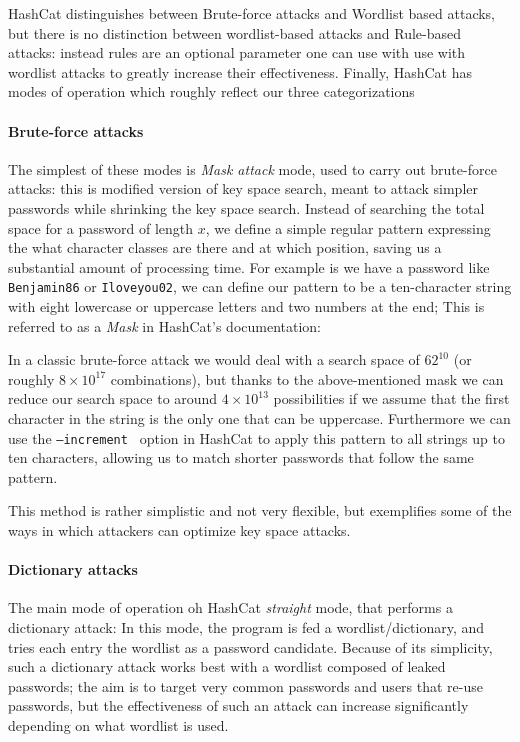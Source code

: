 HashCat distinguishes between Brute-force attacks and Wordlist based attacks, but there is no distinction between wordlist-based attacks and Rule-based attacks: instead rules are an optional parameter one can use with use with wordlist attacks to greatly increase their effectiveness.
Finally, HashCat has modes of operation which roughly reflect our three categorizations 

\paragraph{Brute-force attacks}\label{par:brute-force}
The simplest of these modes is \emph{Mask attack} mode, used to carry out brute-force attacks: this is modified version of key space search, meant to attack simpler passwords while shrinking the key space search. 
Instead of searching the total space for a password of length $x$, we define a simple regular pattern expressing the what character classes are there and at which position, saving us a substantial amount of processing time.
For example is we have a password like \texttt{Benjamin86} or \texttt{Iloveyou02}, we can define our pattern to be a ten-character string with eight lowercase or uppercase letters and two numbers at the end; This is referred to as a \emph{Mask} in HashCat's documentation:

In a classic brute-force attack we would deal with a search space of $62^{10}$ (or roughly $8 \times 10^{17}$ combinations), but thanks to the above-mentioned mask we can reduce our search space to around $4 \times 10^{13}$ possibilities if we assume that the first character in the string is the only one that can be uppercase.
Furthermore we can use the \texttt{--increment } option in HashCat to apply this pattern to all strings up to ten characters, allowing us to match shorter passwords that follow the same pattern.

This method is rather simplistic and not very flexible, but exemplifies some of the ways in which attackers can optimize key space attacks.

\paragraph{Dictionary attacks}
The main mode of operation oh HashCat \emph{straight} mode, that performs a dictionary attack: In this mode, the program is fed a wordlist/dictionary, and tries each entry the wordlist as a password candidate. Because of its simplicity, such a dictionary attack works best with a wordlist composed of leaked passwords; the aim is to target very common passwords and users that re-use passwords, but the effectiveness of such an attack can increase significantly depending on what wordlist is used.


